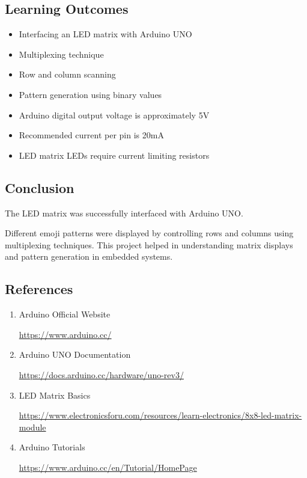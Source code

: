 \subsection{Learning Outcomes}

\begin{itemize}

\item Interfacing an LED matrix with Arduino UNO

\item Multiplexing technique

\item Row and column scanning

\item Pattern generation using binary values

\item Arduino digital output voltage is approximately 5V

\item Recommended current per pin is 20mA

\item LED matrix LEDs require current limiting resistors

\end{itemize}


\subsection{Conclusion}

The LED matrix was successfully interfaced with Arduino UNO.

Different emoji patterns were displayed by controlling rows and columns using multiplexing techniques. This project helped in understanding matrix displays and pattern generation in embedded systems.


\subsection{References}

\begin{enumerate}

\item Arduino Official Website

\url{https://www.arduino.cc/}

\item Arduino UNO Documentation

\url{https://docs.arduino.cc/hardware/uno-rev3/}

\item LED Matrix Basics

\url{https://www.electronicsforu.com/resources/learn-electronics/8x8-led-matrix-module}

\item Arduino Tutorials

\url{https://www.arduino.cc/en/Tutorial/HomePage}

\end{enumerate}